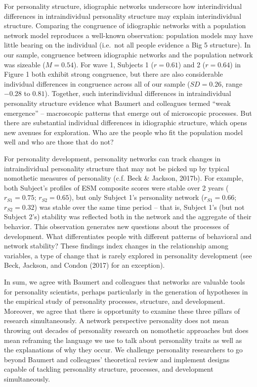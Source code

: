 \documentclass[english,floatsintext,man]{apa6}
\theoremstyle{definition}
\theoremstyle{definition}
\theoremstyle{remark}
\begin{document}
For personality structure, idiographic networks underscore how
interindividual differences in intraindividual personality structure may
explain interindividual structure. Comparing the congruence of
idiographic networks with a population network model reproduces a
well-known observation: population models may have little bearing on the
individual (i.e.~not all people evidence a Big 5 structure). In our
sample, congruence between idiographic networks and the population
network was sizeable (\(M = 0.54\)). For wave 1, Subjects 1
(\(r = 0.61\)) and 2 (\(r = 0.64\)) in Figure 1 both exhibit strong
congruence, but there are also considerable individual differences in
congruence across all of our sample (\(SD = 0.26\), range \(-0.28\) to
\(0.81\)). Together, such interindividual differences in intraindividual
personality structure evidence what Baumert and colleagues termed
\enquote{weak emergence} -- macroscopic patterns that emerge out of
microscopic processes. But there are substantial individual differences
in idiographic structure, which opens new avenues for exploration. Who
are the people who fit the population model well and who are those that
do not?

For personality development, personality networks can track changes in
intraindividual personality structure that may not be picked up by
typical nomothetic measures of personality (c.f. Beck \& Jackson,
2017b). For example, both Subject's profiles of ESM composite scores
were stable over 2 years (\(r_{S1} = 0.75\); \(r_{S2} = 0.65\)), but
only Subject 1's personality network (\(r_{S1} = 0.66\);
\(r_{S2} = 0.32\)) was stable over the same time period -- that is,
Subject 1's (but not Subject 2's) stability was reflected both in the
network and the aggregate of their behavior. This observation generates
new questions about the processes of development. What differentiates
people with different patterns of behavioral and network stability?
These findings index changes in the relationship among variables, a type
of change that is rarely explored in personality development (see Beck,
Jackson, and Condon (2017) for an exception).

In sum, we agree with Baumert and colleagues that networks are valuable
tools for personality scientists, perhaps particularly in the generation
of hypotheses in the empirical study of personality processes,
structure, and development. Moreover, we agree that there is opportunity
to examine these three pillars of research simultaneously. A network
perspective personality does not mean throwing out decades of
personality research on nomothetic approaches but does mean reframing
the language we use to talk about personality traits as well as the
explanations of why they occur. We challenge personality researchers to
go beyond Baumert and colleagues' theoretical review and implement
designs capable of tackling personality structure, processes, and
development simultaneously.
\end{document}
